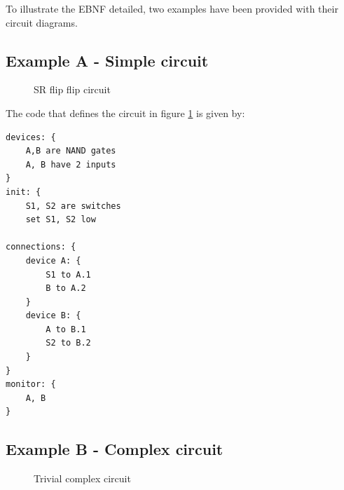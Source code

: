 \documentclass[12pt]{article}
\begin{document}
To illustrate the EBNF detailed, two examples have been provided with their circuit diagrams. 

\subsection{Example A - Simple circuit}

\begin{figure} [ht]
\begin{center}
\caption{SR flip flip circuit}
\label{fig1:SR flip flip circuit}
\end{center}
\end{figure}

The code that defines the circuit in figure \ref{fig1:SR flip flip circuit} is given by:


\begin{minipage}{\linewidth}
\begin{lstlisting}
devices: {
    A,B are NAND gates
    A, B have 2 inputs
}
init: {
    S1, S2 are switches
    set S1, S2 low

connections: {
    device A: {
        S1 to A.1
        B to A.2
    }
    device B: {
        A to B.1
        S2 to B.2
    }
}
monitor: {
    A, B
}
\end{lstlisting}
\end{minipage}

\subsection{Example B - Complex circuit}
 \begin{figure} [ht]
\begin{center}
\caption{Trivial complex circuit}
\label{fig2:trivial complex circuit}
\end{center}
\end{figure}
\end{document}
